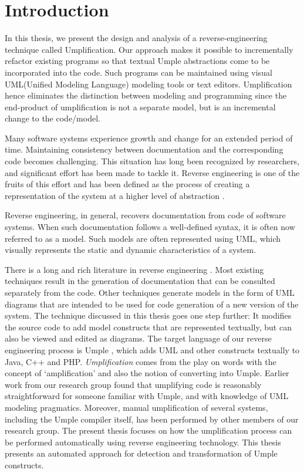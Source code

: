 \chapter{Introduction}

In this thesis, we present the design and analysis of a reverse-engineering technique called Umplification. Our approach makes it possible to incrementally refactor existing programs so that textual Umple abstractions come to be incorporated into the code. Such programs can be maintained using visual UML(Unified Modeling Language) modeling tools or text editors.  Umplification hence eliminates the distinction between modeling and programming since the end-product of umplification is not a separate model, but is an incremental change to the code/model. 

Many software systems experience growth and change for an extended period of time. Maintaining consistency between documentation and the corresponding code becomes challenging. This situation has long been recognized by researchers, and significant effort has been made to tackle it. Reverse engineering is one of the fruits of this effort and has been defined as the process of creating a representation of the system at a higher level of abstraction \cite{Chikofsky}.

Reverse engineering, in general, recovers documentation from code of software systems. When such documentation follows a well-defined syntax, it is often now referred to as a model.  Such models are often represented using UML, which visually represents the static and dynamic characteristics of a system. 

There is a long and rich literature in reverse engineering \cite{CanforaHarman2007}. Most existing techniques result in the generation of documentation that can be consulted separately from the code. Other techniques generate models in the form of UML diagrams that are intended to be used for code generation of a new version of the system. The technique discussed in this thesis goes one step further: It modifies the source code to add model constructs that are represented textually, but can also be viewed and edited as diagrams. The target language of our reverse engineering process is Umple \cite{UmpleMAIN}, which adds UML and other constructs textually to Java, C++ and PHP.
\textit{Umplification} comes from the play on words with the concept of `amplification' and also the notion of converting into Umple. Earlier work from our research group \cite{Lethbridge2010c} found that umplifying code is reasonably straightforward for someone familiar with Umple, and with knowledge of UML modeling pragmatics. Moreover, manual umplification of several systems, including the Umple compiler itself, has been performed by other members of our research group.
The present thesis focuses on how the umplification process can be performed automatically using reverse engineering technology. This thesis presents an automated approach for detection and transformation of Umple constructs.

